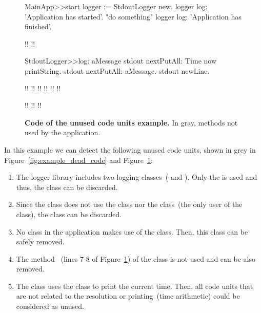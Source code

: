 \begin{figure}[ht]
\begin{code}
MainApp>>start
    logger := StdoutLogger new.
    logger log: 'Application has started'.
    "do something"
    logger log: 'Application has finished'.

!!
!!

StdoutLogger>>log: aMessage
    stdout nextPutAll: Time now printString.
    stdout nextPutAll: aMessage.
    stdout newLine.
    
!!
!!
!!
!!
!!
!!

!!
!!
!!
\end{code}

\caption{ \small\textbf{Code of the unused code units example.} In gray, methods not used by the application.\label{fig:code_example1}}
\end{figure}

In this example we can detect the following unused code units, shown in grey in Figure~\ref{fig:example_dead_code} and Figure~\ref{fig:code_example1}:
\begin{enumerate}
\item The logger library includes two logging classes~( and ). Only the  is used and thus, the  class can be discarded.
\item Since the  class does not use the  class nor the  class~(the only user of the  class), the  class can be discarded.
\item No class in the application makes use of the  class. Then, this class can be safely removed.
\item The method ~(lines 7-8 of Figure~\ref{fig:code_example1}) of the  class is not used and can be also removed.
\item The  class uses the  class to print the current time. Then, all code units that are not related to the  resolution or printing~(\ie time arithmetic) could be considered as unused.
\end{enumerate}

